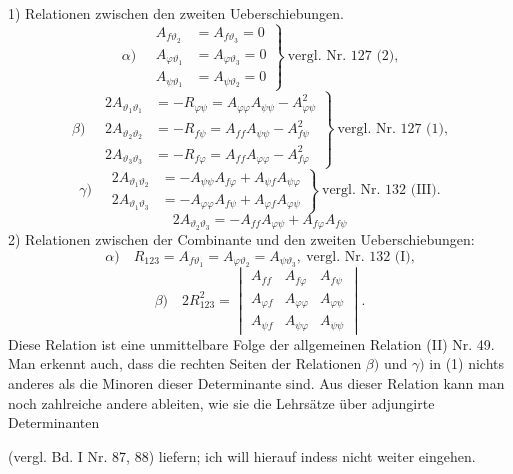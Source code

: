 \documentclass[11pt]{article}
\providecommand{\weberpage}[1]{}
\begin{document}
1) Relationen zwischen den zweiten Ueberschiebungen.
\[
\alpha)\quad
\left.\begin{aligned}
A_{f\vartheta_2} &= A_{f\vartheta_3} = 0\\
A_{\varphi\vartheta_1} &= A_{\varphi\vartheta_3} = 0\\
A_{\psi\vartheta_1} &= A_{\psi\vartheta_2} = 0 %
\end{aligned}\right\}\ \text{vergl. Nr. 127 (2),}
\]
\[
\beta)\quad
\left.\begin{aligned}
2A_{\vartheta_1\vartheta_1} &= -R_{\varphi\psi} = A_{\varphi\varphi}A_{\psi\psi}-A_{\varphi\psi}^2\\
2A_{\vartheta_2\vartheta_2} &= -R_{f\psi} = A_{ff}A_{\psi\psi}-A_{f\psi}^2\\
2A_{\vartheta_3\vartheta_3} &= -R_{f\varphi} = A_{ff}A_{\varphi\varphi}-A_{f\varphi}^2
\end{aligned}\right\}\ \text{vergl. Nr. 127 (1),}
\]
\[
\gamma)\quad
\left.\begin{aligned}
2A_{\vartheta_1\vartheta_2} &= -A_{\psi\psi}A_{f\varphi}+A_{\psi f}A_{\psi\varphi}\\
2A_{\vartheta_1\vartheta_3} &= -A_{\varphi\varphi}A_{f\psi}+A_{\varphi f}A_{\varphi\psi}
\end{aligned}\right\}\ \text{vergl. Nr. 132 (III).}
\]
\[
2A_{\vartheta_2\vartheta_3} = -A_{ff}A_{\varphi\psi}+A_{f\varphi}A_{f\psi}
\]
2) Relationen zwischen der Combinante und den zweiten Ueberschiebungen:
\[
\alpha)\quad R_{123}=A_{f\vartheta_1}=A_{\varphi\vartheta_2}=A_{\psi\vartheta_3},\ \text{vergl. Nr. 132 (I),}
\]
\[
\beta)\quad 2R_{123}^2=
\begin{vmatrix}
A_{ff} & A_{f\varphi} & A_{f\psi}\\
A_{\varphi f} & A_{\varphi\varphi} & A_{\varphi\psi}\\
A_{\psi f} & A_{\psi\varphi} & A_{\psi\psi}
\end{vmatrix}.
\]
Diese Relation ist eine unmittelbare Folge der allgemeinen Relation (II) Nr. 49. Man erkennt auch, dass die rechten Seiten der Relationen $\beta)$ und $\gamma)$ in (1) nichts anderes als die Minoren dieser Determinante sind. Aus dieser Relation kann man noch zahlreiche andere ableiten, wie sie die Lehrs\"atze \"uber adjungirte Determinanten


\weberpage{152}
(vergl. Bd. I Nr. 87, 88) liefern; ich will hierauf indess nicht weiter eingehen.
\end{document}
